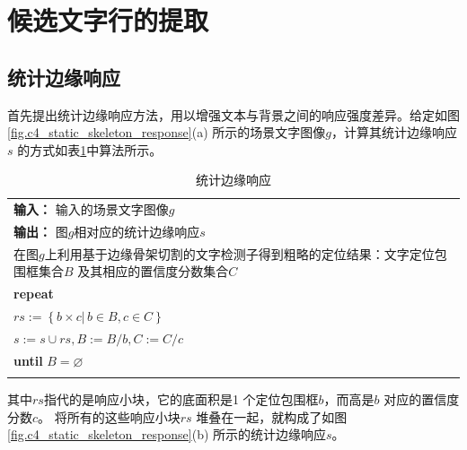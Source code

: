     \section{候选文字行的提取}

        \subsection{统计边缘响应}

        首先提出统计边缘响应方法，用以增强文本与背景之间的响应强度差异。给定如图\ref{fig.c4_static_skeleton_response}(a) 所示的场景文字图像$g$，计算其统计边缘响应$s$ 的方式如表\ref{tab.c4_ser}中算法所示。

        \begin{table}[!h]
        \renewcommand\arraystretch{1.5}
        \centering
        \caption{统计边缘响应}
        \begin{tabular}{p{}}
        \toprule
        \textbf{输入：} 输入的场景文字图像$g$\\
        \textbf{输出：} 图$g$相对应的统计边缘响应$s$\\
        \midrule
         在图$g$上利用基于边缘骨架切割的文字检测子得到粗略的定位结果：文字定位包围框集合$B$ 及其相应的置信度分数集合$C$\\
         \textbf{repeat} \\
        \qquad \qquad $rs:=\left\{ b \times c  |\,b \in B, c \in C\right\}$ \\
        \qquad \qquad  $s:=s\cup rs,B:=B / b,C:=C / c$ \\
        \textbf{until} $B=\varnothing$ \\
        \bottomrule
        \label{tab.c4_ser}
        \end{tabular}
        \end{table}

        其中$rs$指代的是响应小块，它的底面积是1 个定位包围框$b$，而高是$b$ 对应的置信度分数$c$。 将所有的这些响应小块$rs$ 堆叠在一起，就构成了如图\ref{fig.c4_static_skeleton_response}(b) 所示的统计边缘响应$s$。

